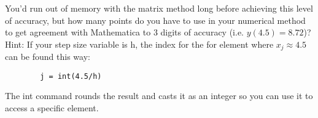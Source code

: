 \begin{problem}
\begin{enumerate}[label=(\alph*)]
	You\rq d run out of memory with the matrix method long before achieving this level of accuracy, but how many points do you have to use in your numerical method to get agreement with Mathematica to 3 digits of accuracy (i.e. $y(4.5) = 8.72$)?		
		\\
		Hint: If your step size variable is h, the index for the for element where
$x_j \approx 4.5$ can be found this way:
	\begin{lstlisting}
		j = int(4.5/h)
	\end{lstlisting}
	The int command rounds the result and casts it as an integer so you can use it to access a specific element.
	\end{enumerate}
\end{problem}
	
